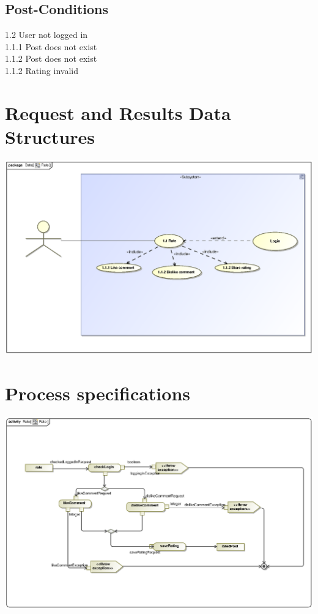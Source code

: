 \documentclass{scrreprt}
\begin{document}
\subsection{Post-Conditions}%
1.2	User not logged in\\
1.1.1 Post does not exist\\
1.1.2 Post does not exist\\
1.1.2 Rating invalid\\

\section{Request and Results Data Structures} 
\includegraphics[scale=.9]{graphics/rateUseCase.eps}\\

\section{Process specifications}
\includegraphics[scale=.9]{graphics/rateActivityDiagram.eps}\\
\end{document}
